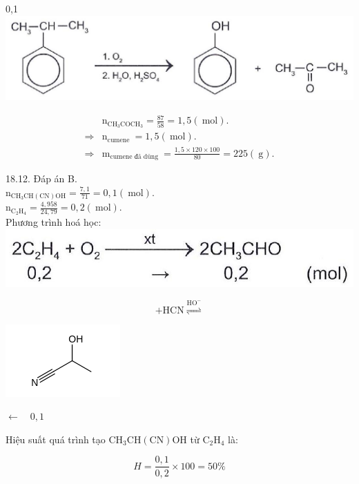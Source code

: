 \documentclass[10pt]{article}
\begin{document}
0,1\\
\includegraphics[max width=\textwidth, center]{2025_10_23_adad5b98d65ac6665838g-37(2)}

$$
\begin{aligned}
& \mathrm{n}_{\mathrm{CH}_{3} \mathrm{COCH}_{3}}=\frac{87}{58}=1,5(\mathrm{~mol}) . \\
\Rightarrow & \mathrm{n}_{\text {cumene }}=1,5(\mathrm{~mol}) . \\
\Rightarrow & \mathrm{m}_{\text {cumene đâ düng }}=\frac{1,5 \times 120 \times 100}{80}=225(\mathrm{~g}) .
\end{aligned}
$$

18.12. Đáp án B.\\
$\mathrm{n}_{\mathrm{CH}_{3} \mathrm{CH}(\mathrm{CN}) \mathrm{OH}}=\frac{7,1}{71}=0,1(\mathrm{~mol})$.\\
$\mathrm{n}_{\mathrm{C}_{2} \mathrm{H}_{4}}=\frac{4,958}{24,79}=0,2(\mathrm{~mol})$.\\
Phương trình hoá học:\\
\includegraphics[max width=\textwidth, center]{2025_10_23_adad5b98d65ac6665838g-37}

$$
+\mathrm{HCN} \stackrel{\mathrm{HO}^{-}}{\rightleftharpoons}
$$

\includegraphics{smile-f6e1dc0231214236c6b345810752d92b48fd50a8}

$\leftarrow \quad 0,1$

Hiệu suất quá trình tạo $\mathrm{CH}_{3} \mathrm{CH}(\mathrm{CN}) \mathrm{OH}$ từ $\mathrm{C}_{2} \mathrm{H}_{4}$ là:

$$
H=\frac{0,1}{0,2} \times 100=50 \%
$$
\end{document}
